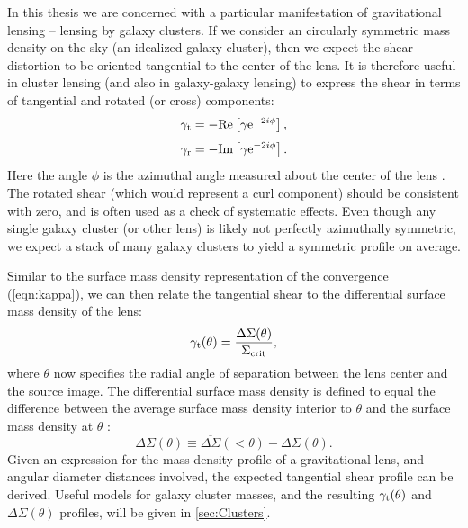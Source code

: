In this thesis we are concerned with a particular manifestation of gravitational lensing -- lensing by galaxy clusters. If we consider an circularly symmetric mass density on the sky (an idealized galaxy cluster), then we expect the shear distortion to be oriented tangential to the center of the lens. It is therefore useful in cluster lensing (and also in galaxy-galaxy lensing) to express the shear in terms of tangential and rotated (or cross) components:
\begin{equation}
\gamma_{\rm t} = -{\rm Re}\left[ \gamma {\rm e}^{-2i\phi} \right],  
\end{equation}
\begin{equation}
\gamma_{\rm r} = -{\rm Im}\left[ \gamma {\rm e}^{-2i\phi} \right].
\end{equation}
Here the angle $\phi$ is the azimuthal angle measured about the center of the lens \citep{Schneider06_WeakGravLens}. The rotated shear (which would represent a curl component) should be consistent with zero, and is often used as a check of systematic effects. Even though any single galaxy cluster (or other lens) is likely not perfectly azimuthally symmetric, we expect a stack of many galaxy clusters to yield a symmetric profile on average.

Similar to the surface mass density representation of the convergence (\autoref{eqn:kappa}), we can then relate the tangential shear to the differential surface mass density of the lens:
\begin{equation}
\gamma_{\rm t}(\theta) = \frac{\Delta\Sigma(\theta)}{\Sigma_{\rm crit}},
\end{equation}
where $\theta$ now specifies the radial angle of separation between the lens center and the source image. The differential surface mass density is defined to equal the difference between the average surface mass density interior to $\theta$ and the surface mass density at $\theta$ \citep{Wright00}: 
\begin{equation}
\Delta\Sigma(\theta) \equiv \overline{\Delta\Sigma}(< \theta) - \Delta\Sigma(\theta).
\end{equation}
Given an expression for the mass density profile of a gravitational lens, and angular diameter distances involved, the expected tangential shear profile can be derived. Useful models for galaxy cluster masses, and the resulting $\gamma_{\rm t}(\theta)$ and $\Delta\Sigma(\theta)$ profiles, will be given in \autoref{sec:Clusters}.

